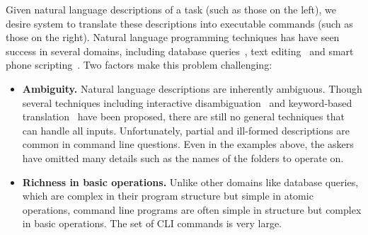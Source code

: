 Given natural language descriptions of a task (such as those on the left), we desire system to translate these descriptions into executable commands (such as those on the right). Natural language programming techniques has have seen success in several domains, including database queries~\cite{DBLP:journals/pvldb/LiJ14, DBLP:conf/sigmod/GulwaniM14}, text editing~\cite{DBLP:journals/corr/DesaiGHJKMRR15} and smart phone scripting~\cite{DBLP:conf/mobisys/LeGS13}. Two factors make this problem challenging:
\begin{itemize}
\item \textbf{Ambiguity.} Natural language descriptions are inherently ambiguous. Though several techniques including interactive disambiguation~\cite{DBLP:journals/pvldb/LiJ14} and keyword-based translation~\cite{DBLP:conf/sigmod/GulwaniM14} have been proposed, there are still no general techniques that can handle all inputs. Unfortunately, partial and ill-formed descriptions are common in command line questions. Even in the examples above, the askers have omitted many details such as the names of the folders to operate on.
\item \textbf{Richness in basic operations.} Unlike other domains like database queries, which are complex in their program structure but simple in atomic operations, command line programs are often simple in structure but complex in basic operations. The set of CLI commands is very large.
\end{itemize}

